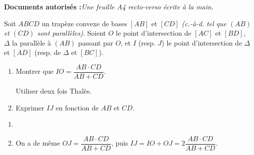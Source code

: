 \documentclass[a4paper,12pt,reqno]{amsart}
\begin{document}
\ifsolutions\else
\textbf{Documents autorisés :}\textit{Une feuille A4 recto-verso écrite à la main.}

\vspace{7mm}
\fi

\begin{exo}

  Soit $ABCD$  un trapèze convexe de bases $[AB]$ et $[CD]$ \emph{(c.-à-d. tel que $(AB)$ et $(CD)$ sont parallèles)}. Soient $O$ le point d'intersection de $[AC]$ et $[BD]$, $\Delta$ la parallèle à $(AB)$ passant par $O$, et $I$ (resp. $J$) le point d'intersection de $\Delta$ et $[AD]$ (resp. de $\Delta$ et $[BC]$).
  \begin{enumerate}
    \item Montrer que $IO=\dfrac{AB \cdot CD}{AB+CD}$.\quad
    \begin{indication}
      Utiliser deux fois Thalès.
    \end{indication}
    \item Exprimer $IJ$ en fonction de $AB$ et $CD$.
  \end{enumerate}
\end{exo}

\begin{solution}
  \begin{enumerate}
    \item
    \item On a de même $OJ=\dfrac{AB \cdot CD}{AB+CD}$, puis $IJ=IO+OJ=2\dfrac{AB \cdot CD}{AB+CD}$.
  \end{enumerate}
\end{solution}
\end{document}
